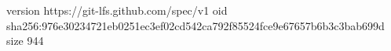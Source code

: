 version https://git-lfs.github.com/spec/v1
oid sha256:976e30234721eb0251ec3ef02cd542ca792f85524fce9e67657b6b3c3bab699d
size 944
